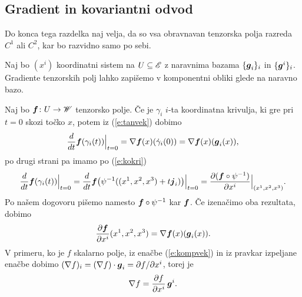 \subsection{Gradient in kovariantni odvod}


Do konca tega razdelka naj velja, da so vsa obravnavan tenzorska polja razreda
$C^{1}$ ali $C^{2}$, kar bo razvidno samo po sebi.

Naj bo $(x^i)$ koordinatni sistem na $U\subseteq\mathscr E$ z naravnima bazama $\{\boldsymbol g_i\}_i$ in $\{\boldsymbol g^i\}_i$.
Gradiente tenzorskih polj lahko zapišemo v komponentni obliki glede na naravno bazo.

Naj bo $\boldsymbol f\colon U\to\mathscr W$ tenzorsko polje. Če je $\gamma_i$ $i$-ta
koordinatna krivulja, ki gre pri $t=0$ skozi točko $x$, potem iz (\ref{e:tanvek}) dobimo
\begin{equation*}
	\frac{d}{dt}\boldsymbol f(\gamma_i(t))\Big|_{t=0}=
	\nabla \boldsymbol f(x)(\dot{\gamma}_i(0))=\nabla \boldsymbol f(x)(\boldsymbol g_i(x)),
\end{equation*}
po drugi strani pa imamo po (\ref{e:kokri})
\begin{equation*}
	\frac{d}{dt}\boldsymbol f(\gamma_i(t))\Big|_{t=0}=
	\frac{d}{dt}\boldsymbol f\big(\psi^{-1}((x^1,x^2,x^3)+t\boldsymbol j_i)\big)\Big|_{t=0}=
	\frac{\partial(\boldsymbol f\circ\psi^{-1})}{\partial x^i}\Big|_{(x^1,x^2,x^3)}.
\end{equation*}
Po našem dogovoru pišemo namesto $\boldsymbol f\circ\psi^{-1}$ kar $\boldsymbol f$. Če izenačimo oba rezultata, dobimo
\begin{equation} \label{e:sotf}
	\frac{\partial\boldsymbol f}{\partial x^i}(x^1,x^2,x^3)=\nabla \boldsymbol f(x)(\boldsymbol g_i(x)).
\end{equation}
V primeru, ko je $f$ skalarno polje, iz enačbe (\ref{e:kompvek}) in iz pravkar izpeljane enačbe
dobimo $(\nabla f)_i=(\nabla f)\cdot\boldsymbol g_i=\partial f/\partial x^i$, torej je
\begin{equation} \label{e:gradskal}
	\nabla f = \frac{\partial f}{\partial x^i}\,\boldsymbol g^i.
\end{equation}

